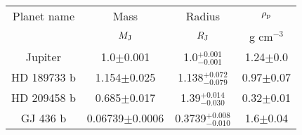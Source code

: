 \begin{table}
\begin{tabular}{cccc}
Planet name & Mass & Radius & $\rho_{\rm p}$ \\
 & $M_{\rm J}$ & $R_{\rm J}$ & g cm$^{-3}$ \\
Jupiter & 1.0$\pm$0.001 & 1.0$^{+0.001}_{-0.001}$ & 1.24$\pm$0.0 \\
HD 189733 b & 1.154$\pm$0.025 & 1.138$^{+0.072}_{-0.079}$ & 0.97$\pm$0.07 \\
HD 209458 b & 0.685$\pm$0.017 & 1.39$^{+0.014}_{-0.030}$ & 0.32$\pm$0.01 \\
GJ 436 b & 0.06739$\pm$0.0006 & 0.3739$^{+0.008}_{-0.010}$ & 1.6$\pm$0.04 \\
\end{tabular}
\end{table}
